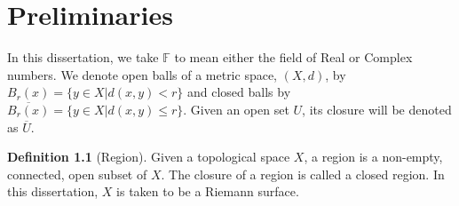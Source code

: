 \documentclass[11pt]{report}
\theoremstyle{definition}
\newtheorem{defn}[thm]{Definition}
\begin{document}
\chapter{Preliminaries}

In this dissertation, we take $\mathbb{F}$ to mean either the field of Real or Complex numbers. We denote open balls of a metric space, $(X,d)$, by $B_r(x) = \{y \in X \vert d(x,y) < r\}$ and closed balls by $\overline{B_r(x)} = \{y \in X \vert d(x,y) \leq r\}$. Given an open set $U$, its closure will be denoted as $\overline{U}$.
\begin{defn}[Region]
  Given a topological space $X$, a region is a non-empty, connected, open subset of $X$. The closure of a region is called a closed region. In this dissertation, $X$ is taken to be a Riemann surface.
\end{defn}
\end{document}
